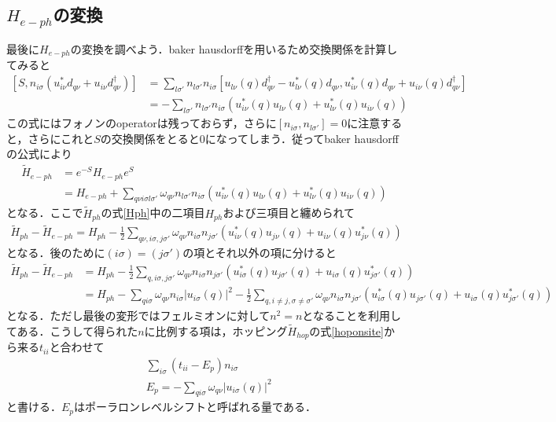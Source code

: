 \documentclass[a4j]{jarticle}
\begin{document}
\subsection{$H_{e-ph}$の変換}
最後に$H_{e-ph}$の変換を調べよう．baker hausdorffを用いるため交換関係を計算してみると
\begin{align}
 \left[S,n_{i\sigma}\left(u_{i\nu}^*d_{q\nu}+u_{i\nu}d_{q\nu}^{\dagger}\right)\right] 
 &=\sum_{l\sigma'}n_{l\sigma'}n_{i\sigma}\left[u_{l\nu}(q)d_{q\nu}^{\dagger}-u_{l\nu}^*(q)d_{q\nu},u_{i\nu}^*(q)d_{q\nu}+u_{i\nu}(q)d_{q\nu}^{\dagger}\right] \\
&=-\sum_{l\sigma'}n_{l\sigma'}n_{i\sigma}\left(u_{i\nu}^*(q)u_{l\nu}(q)+u_{l\nu}^*(q)u_{i\nu}(q)\right)
\end{align}
この式にはフォノンのoperatorは残っておらず，さらに$[n_{i\sigma},n_{l\sigma'}]=0$に注意すると，さらにこれと$S$の交換関係をとると$0$になってしまう．従ってbaker hausdorffの公式により
\begin{align}
 \tilde{H}_{e-ph}&=e^{-S}H_{e-ph}e^{S} \\
&=H_{e-ph}+\sum_{q\nu i\sigma l\sigma'}\omega_{q\nu}n_{l\sigma'}n_{i\sigma}\left(u_{i\nu}^*(q)u_{l\nu}(q)+u_{l\nu}^*(q)u_{i\nu}(q)\right)
\end{align}
となる．ここで$\tilde{H}_{ph}$の式\eqref{Hph}中の二項目$H_{ph}$および三項目と纏められて
\begin{align}
 \tilde{H}_{ph}-\tilde{H}_{e-ph}=H_{ph}-\frac{1}{2}\sum_{q\nu ,i\sigma,j\sigma'}\omega_{q\nu} n_{i\sigma} n_{j\sigma'}\left(u_{i\nu}^*(q)u_{j\nu}(q)+u_{i\nu}(q)u_{j\nu}^*(q)\right)
\end{align}
となる．後のために$(i\sigma)=(j\sigma')$の項とそれ以外の項に分けると
\begin{align}
 \tilde{H}_{ph}-\tilde{H}_{e-ph}&=H_{ph}-\frac{1}{2}\sum_{q,i\sigma,j\sigma'}\omega_{q\nu} n_{i\sigma} n_{j\sigma'}\left(u_{i\sigma}^*(q)u_{j\sigma'}(q)+u_{i\sigma}(q)u_{j\sigma'}^*(q)\right) \\
&=H_{ph}-\sum_{qi\sigma}\omega_{q\nu}n_{i\sigma}\left|u_{i\sigma}(q)\right|^2-\frac{1}{2}\sum_{q,i\neq j,\sigma\neq\sigma'}\omega_{q\nu} n_{i\sigma} n_{j\sigma'}\left(u_{i\sigma}^*(q)u_{j\sigma'}(q)+u_{i\sigma}(q)u_{j\sigma'}^*(q)\right) 
\end{align}
となる．ただし最後の変形ではフェルミオンに対して$n^2=n$となることを利用してある．こうして得られた$n$に比例する項は，ホッピング$\tilde{H}_{hop}$の式\eqref{hoponsite}から来る$t_{ii}$と合わせて
\begin{align} 
 &\sum_{i\sigma}(t_{ii}-E_p)n_{i\sigma} \\
 &E_p=-\sum_{qi\sigma}\omega_{q\nu}\left|u_{i\sigma}(q)\right|^2
\end{align}
と書ける．$E_p$はポーラロンレベルシフトと呼ばれる量である．
\end{document}
